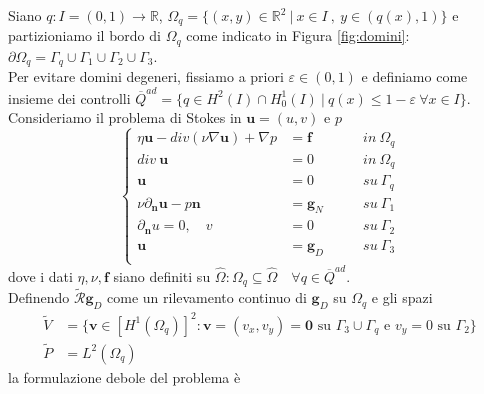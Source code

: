 \documentclass[a4paper,11pt,twoside]{article}
\renewcommand{\v}{\mathbf{v}}
\newcommand{\Oq}{{\Omega_q}}
\theoremstyle{plain}
\theoremstyle{definition}
\theoremstyle{remark}
\begin{document}

Siano $q:I=(0,1)\to\mathds{R}$, $\Omega_q =\{(x,y)\in \mathds{R}^2\ |\ x\in I\ ,\ y\in (q(x),1)\}$ e partizioniamo il bordo di $\Omega_q$ come indicato in Figura \ref{fig:domini}: $\partial\Omega_q=\Gamma_q\cup\Gamma_1\cup\Gamma_2\cup\Gamma_3$.\\
Per evitare domini degeneri, fissiamo a priori $\varepsilon\in(0,1)$ e definiamo come insieme dei controlli $\overline{Q}^{ad}=\{q\in H^2(I)\cap H^1_0(I)\ |\ q(x)\leq 1-\varepsilon \ \forall x\in I \}$.\\
Consideriamo il problema di Stokes in $\mathbf{u}=(u,v)$ e $p$
\begin{equation}
\left\{
\begin{aligned}
	\eta \mathbf{u} - div(\nu\nabla\mathbf{u}) + \nabla p &= \mathbf{f} \qquad &in\ \Omega_q\\
	div\ \mathbf{u} &= 0 \qquad &in\ \Omega_q\\
	\mathbf{u} &= 0 \qquad &su\ \Gamma_q\\
	\nu\partial_\mathbf{n }\mathbf{u} - p \mathbf{n} &= \mathbf{g}_N\qquad &su\ \Gamma_1\\%
	\partial_\mathbf{n} u = 0,\quad v&=0\qquad &su\ \Gamma_2\\
	\mathbf{u} &= \mathbf{g}_D\qquad &su\ \Gamma_3\\%
\end{aligned}
\right.
\label{eq:Stokes}
\end{equation}
dove i dati $\eta,\nu,\mathbf{f}$ siano definiti su $\hat{\Omega}: \Omega_q\subseteq\hat{\Omega}\quad\forall q\in \overline{Q}^{ad}$.\\
Definendo $\widetilde{\mathcal{R}}\mathbf{g}_D$ come un rilevamento continuo di $\mathbf{g}_D$ su $\Omega_q$ e gli spazi
\begin{equation*}\begin{split}
	\widetilde{V}&=\{\v\in[H^1(\Oq)]^2\colon \v=(v_x,v_y)=\mathbf 0\text{ su }\Gamma_3\cup\Gamma_q\text{ e }v_y=0\text{ su }\Gamma_2\}\\
	\widetilde{P}&=L^2(\Oq)
\end{split}\end{equation*}
la formulazione debole del problema \`e
\end{document}
